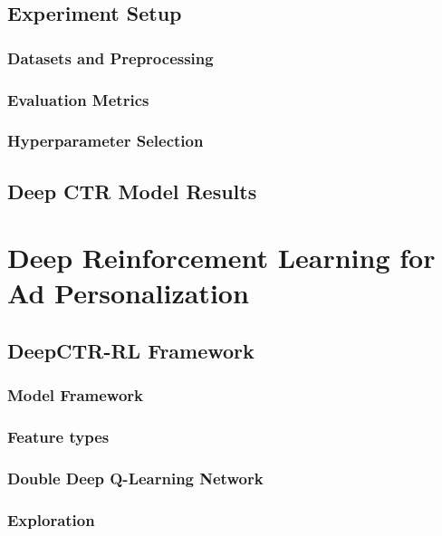 \documentclass{mldsmsc}
\begin{document}
\section{Experiment Setup}

\subsection{Datasets and Preprocessing}

\subsection{Evaluation Metrics}

\subsection{Hyperparameter Selection}

\section{Deep CTR Model Results}

\chapter{Deep Reinforcement Learning for Ad Personalization}
\label{chap:deep-rl-for-ad-personalization}

\section{DeepCTR-RL Framework}

\subsection{Model Framework}

\subsection{Feature types}

\subsection{Double Deep Q-Learning Network}

\subsection{Exploration}
\end{document}
